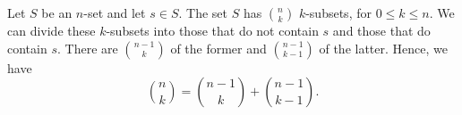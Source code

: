 Let $S$ be an $n$-set and let $s\in S$.
The set $S$ has $\binom{n}{k}$ $k$-subsets, for $0\le k\le n$.
We can divide these $k$-subsets into those that do not contain $s$ and those that do contain $s$.
There are $\binom{n-1}{k}$ of the former and $\binom{n-1}{k-1}$ of the latter.
Hence, we have
\[
    \binom{n}{k} = \binom{n-1}{k}+\binom{n-1}{k-1}.
\]
